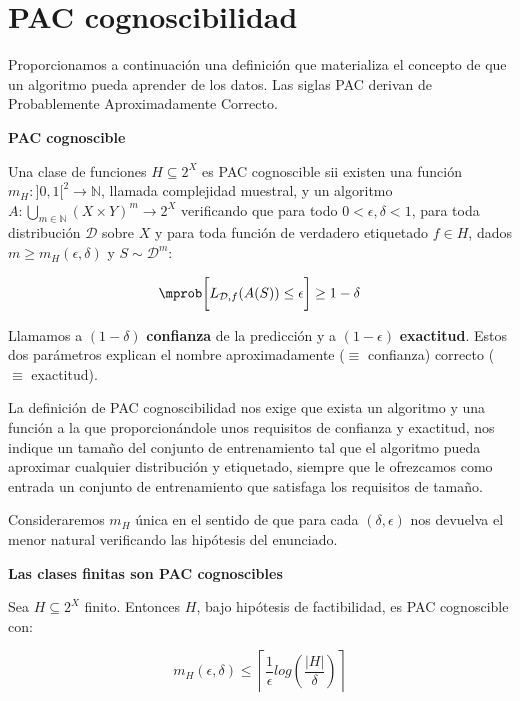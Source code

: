 \section{PAC cognoscibilidad}
Proporcionamos a continuación una definición que materializa el concepto de que un algoritmo pueda aprender de los datos. Las
siglas PAC derivan de Probablemente Aproximadamente Correcto.

\begin{definition} \textbf{PAC cognoscible}

Una clase de funciones $H \subseteq 2^X$ es PAC cognoscible sii existen una función 
$m_{H} : ]0,1[^2\rightarrow \mathbb{N}$, llamada complejidad muestral, y un algoritmo 
$A: \underset{m\in \mathbb{N}}{\bigcup} (X\times Y)^m \rightarrow 2^X$ verificando que para todo
$0 < \epsilon, \delta < 1$, para toda distribución $\mathcal{D}$ sobre $X$ y para toda función de 
verdadero etiquetado $f\in H$, dados $m \ge m_H(\epsilon, \delta)$ y $S\sim \mathcal{D}^m$:

\[\mprob \bigg[L_{\mathcal{D},f}(A(S)) \le \epsilon \bigg] \ge 1-\delta\]

\label{def:pac}
\end{definition}

Llamamos a $(1-\delta)$ \textbf{confianza} de la predicción y a $(1-\epsilon)$ \textbf{exactitud}. Estos dos parámetros 
explican el nombre aproximadamente ($\equiv$ confianza) correcto ($\equiv$ exactitud).

La definición de PAC cognoscibilidad nos exige que exista un algoritmo y una función a la que proporcionándole unos requisitos
de confianza y exactitud, nos indique un tamaño del conjunto de entrenamiento tal que el algoritmo pueda aproximar cualquier
distribución y etiquetado, siempre que le ofrezcamos como entrada un conjunto de entrenamiento que satisfaga los 
requisitos de tamaño.

Consideraremos $m_{H}$ única en el sentido de que para cada $(\delta, \epsilon)$ nos devuelva el menor natural
verificando las hipótesis del enunciado.

\begin{theorem} \textbf{Las clases finitas son PAC cognoscibles}

Sea $H \subseteq 2^{X}$ finito. Entonces $H$, bajo hipótesis de factibilidad, es PAC cognoscible con:

\[m_H(\epsilon, \delta) \le \left\lceil \frac{1}{\epsilon}log \left(\frac{|H|}{\delta} \right) \right\rceil\]
\end{theorem}

